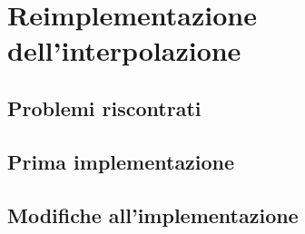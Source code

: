 \documentclass[main.tex]{subfiles}
\begin{document}
\sloppy


\vspace{1.0cm}

\section{Reimplementazione dell'interpolazione}\label{sec:Interpolation}

\subsection{Problemi riscontrati}\label{subsec:4_oldProblems}

\subsection{Prima implementazione}\label{subsec:4_trafficImplementation}

\subsection{Modifiche all'implementazione}\label{subsec:4_edits}
\end{document}
